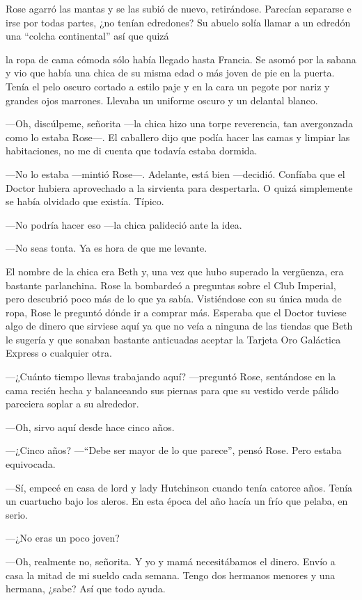 {Rose agarró las mantas y se las subió de nuevo, retirándose. Parecían
	separarse e irse por todas partes, ¿no tenían edredones? Su abuelo
solía llamar a un edredón una ``colcha continental'' así que quizá}

{la ropa de cama cómoda sólo había llegado hasta Francia. Se asomó por
	la sabana y vio que había una chica de su misma edad o más joven de pie
	en la puerta. Tenía el pelo oscuro cortado a estilo paje y en la cara un
	pegote por nariz y grandes ojos marrones. Llevaba un uniforme oscuro y
un delantal blanco.}

{---Oh, discúlpeme, señorita ---la chica hizo una torpe reverencia, tan
	avergonzada como lo estaba Rose---. El caballero dijo que podía hacer
	las camas y limpiar las habitaciones, no me di cuenta que todavía estaba
dormida.}

{---No lo estaba ---mintió Rose---. Adelante, está bien ---decidió.
	Confíaba que el Doctor hubiera aprovechado a la sirvienta para
despertarla. O quizá simplemente se había olvidado que existía. Típico.}

{---No podría hacer eso ---la chica palideció ante la idea.}

{---No seas tonta. Ya es hora de que me levante.}

{El nombre de la chica era Beth y, una vez que hubo superado la
	vergüenza, era bastante parlanchina. Rose la bombardeó a preguntas sobre
	el Club Imperial, pero descubrió poco más de lo que ya sabía.
	Vistiéndose con su única muda de ropa, Rose le preguntó dónde ir a
	comprar más. Esperaba que el Doctor tuviese algo de dinero que sirviese
	aquí ya que no veía a ninguna de las tiendas que Beth le sugería y que
	sonaban bastante anticuadas aceptar la Tarjeta Oro Galáctica Express o
cualquier otra.}

{---¿Cuánto tiempo llevas trabajando aquí? ---preguntó Rose, sentándose
	en la cama recién hecha y balanceando sus piernas para que su vestido
verde pálido pareciera soplar a su alrededor.}

{---Oh, sirvo aquí desde hace cinco años.}

{---¿Cinco años? ---``Debe ser mayor de lo que parece'', pensó Rose.
Pero estaba equivocada.}

{---Sí, empecé en casa de lord y lady Hutchinson cuando tenía catorce
	años. Tenía un cuartucho bajo los aleros. En esta época del año hacía un
frío que pelaba, en serio.}

{---¿No eras un poco joven?}

{---Oh, realmente no, señorita. Y yo y mamá necesitábamos el dinero.
	Envío a casa la mitad de mi sueldo cada semana. Tengo dos hermanos
menores y una hermana, ¿sabe? Así que todo ayuda.}

